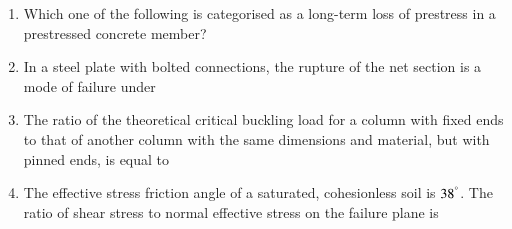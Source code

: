\documentclass[journal]{IEEEtran}
\begin{document}
\begin{enumerate}
\item Which one of the following is categorised as a long-term loss of prestress in a prestressed concrete member? \hfill {}
\begin{enumerate}
\end{enumerate}

\item In a steel plate with bolted connections, the rupture of the net section is a mode of failure under \hfill {}
\begin{enumerate}
\end{enumerate}

\item The ratio of the theoretical critical buckling load for a column with fixed ends to that of another column with the same dimensions and material, but with pinned ends, is equal to \hfill {}
\begin{enumerate}
\end{enumerate}

\item The effective stress friction angle of a saturated, cohesionless soil is $38^\degree$. The ratio of shear stress to normal effective stress on the failure plane is \hfill {}
\begin{enumerate}
\end{enumerate}


\end{enumerate}
\end{document}
